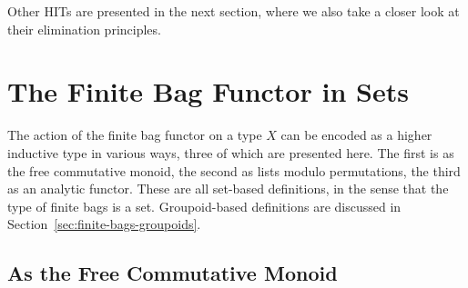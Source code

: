 \documentclass[a4paper,USenglish,cleveref]{lipics-v2021}
\begin{document}
Other HITs are presented in the next section, where we also take a closer look at their elimination principles.



\section{The Finite Bag Functor in Sets}\label{sec:finite-bags-sets}

The action of the finite bag functor on a type $X$ can be encoded as a higher inductive
type in various ways, three of which are presented here. 
The first is as the free commutative monoid, the second as lists modulo permutations,
the third as an analytic functor. These are all set-based definitions, in the sense that the type of finite bags is a set. Groupoid-based definitions are discussed in Section~\ref{sec:finite-bags-groupoids}.

\subsection{As the Free Commutative Monoid}
\end{document}
